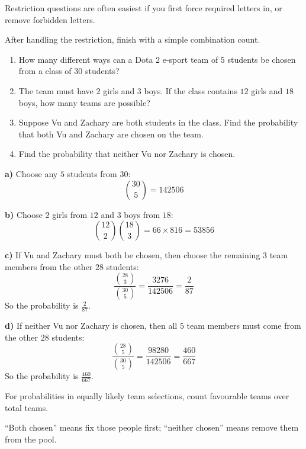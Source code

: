 \begin{takeaways}
\item Restriction questions are often easiest if you first force required letters in, or remove forbidden letters.
\item After handling the restriction, finish with a simple combination count.
\end{takeaways}

\begin{problem}
\begin{enumerate}[label=\alph*)]
\item How many different ways can a Dota 2 e-sport team of $5$ students be chosen from a class of $30$ students?
\item The team must have $2$ girls and $3$ boys. If the class contains $12$ girls and $18$ boys, how many teams are possible?
\item Suppose Vu and Zachary are both students in the class. Find the probability that both Vu and Zachary are chosen on the team.
\item Find the probability that neither Vu nor Zachary is chosen.
\end{enumerate}
\end{problem}

\begin{solution}
\textbf{a)} Choose any $5$ students from $30$:
\[
\binom{30}{5} = 142506
\]

\textbf{b)} Choose $2$ girls from $12$ and $3$ boys from $18$:
\[
\binom{12}{2}\binom{18}{3} = 66 \times 816 = 53856
\]

\textbf{c)} If Vu and Zachary must both be chosen, then choose the remaining $3$ team members from the other $28$ students:
\[
\frac{\binom{28}{3}}{\binom{30}{5}} = \frac{3276}{142506} = \frac{2}{87}
\]
So the probability is $\boxed{\frac{2}{87}}$.

\textbf{d)} If neither Vu nor Zachary is chosen, then all $5$ team members must come from the other $28$ students:
\[
\frac{\binom{28}{5}}{\binom{30}{5}} = \frac{98280}{142506} = \frac{460}{667}
\]
So the probability is $\boxed{\frac{460}{667}}$.
\end{solution}

\begin{takeaways}
\item For probabilities in equally likely team selections, count favourable teams over total teams.
\item ``Both chosen'' means fix those people first; ``neither chosen'' means remove them from the pool.
\end{takeaways}

